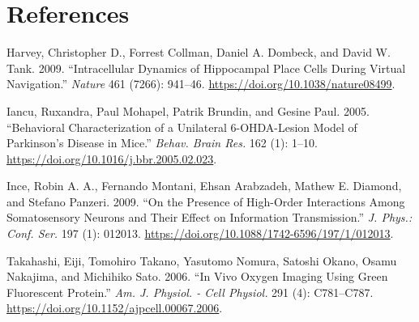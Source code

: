\documentclass[
  12pt,
]{report}
\numberwithin{figure}{section}
\numberwithin{table}{section}
\numberwithin{equations}{section}
\begin{document}
\hypertarget{references}{%
\chapter*{References}\label{references}}

\hypertarget{refs}{}
\leavevmode\hypertarget{ref-harvey_intracellular_2009}{}%
Harvey, Christopher D., Forrest Collman, Daniel A. Dombeck, and David W.
Tank. 2009. ``Intracellular Dynamics of Hippocampal Place Cells During
Virtual Navigation.'' \emph{Nature} 461 (7266): 941--46.
\url{https://doi.org/10.1038/nature08499}.

\leavevmode\hypertarget{ref-iancu_behavioral_2005}{}%
Iancu, Ruxandra, Paul Mohapel, Patrik Brundin, and Gesine Paul. 2005.
``Behavioral Characterization of a Unilateral 6-OHDA-Lesion Model of
Parkinson's Disease in Mice.'' \emph{Behav. Brain Res.} 162 (1): 1--10.
\url{https://doi.org/10.1016/j.bbr.2005.02.023}.

\leavevmode\hypertarget{ref-ince_presence_2009}{}%
Ince, Robin A. A., Fernando Montani, Ehsan Arabzadeh, Mathew E. Diamond,
and Stefano Panzeri. 2009. ``On the Presence of High-Order Interactions
Among Somatosensory Neurons and Their Effect on Information
Transmission.'' \emph{J. Phys.: Conf. Ser.} 197 (1): 012013.
\url{https://doi.org/10.1088/1742-6596/197/1/012013}.

\leavevmode\hypertarget{ref-takahashi_vivo_2006}{}%
Takahashi, Eiji, Tomohiro Takano, Yasutomo Nomura, Satoshi Okano, Osamu
Nakajima, and Michihiko Sato. 2006. ``In Vivo Oxygen Imaging Using Green
Fluorescent Protein.'' \emph{Am. J. Physiol. - Cell Physiol.} 291 (4):
C781--C787. \url{https://doi.org/10.1152/ajpcell.00067.2006}.
\end{document}
